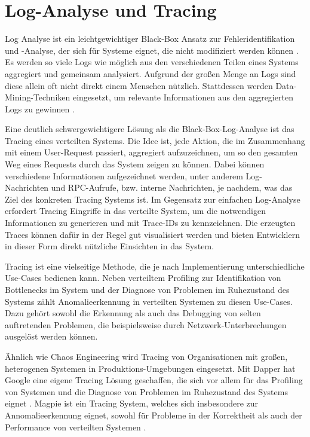 \documentclass[12pt,a4paper]{report}
\begin{document}
\section{Log-Analyse und Tracing}
Log Analyse ist ein leichtgewichtiger Black-Box Ansatz zur Fehleridentifikation und -Analyse, der sich für Systeme eignet, die
nicht modifiziert werden können \cite{challenges_and_options}. Es werden so viele Logs wie möglich aus den
verschiedenen Teilen eines Systems aggregiert und gemeinsam analysiert. Aufgrund der großen Menge an Logs sind diese allein oft
nicht direkt einem Menschen nützlich. Stattdessen werden Data-Mining-Techniken eingesetzt, um relevante Informationen aus den
aggregierten Logs zu gewinnen \cite{log_analysis_at_google}.

Eine deutlich schwergewichtigere Lösung als die Black-Box-Log-Analyse ist das Tracing eines verteilten Systems. Die Idee ist, jede
Aktion, die im Zusammenhang mit einem User-Request passiert, aggregiert aufzuzeichnen, um so den gesamten Weg eines Requests durch
das System zeigen zu können. Dabei können verschiedene Informationen aufgezeichnet werden, unter anderem Log-Nachrichten und
RPC-Aufrufe, bzw. interne Nachrichten, je nachdem, was das Ziel des konkreten Tracing Systems ist. Im Gegensatz zur einfachen
Log-Analyse erfordert Tracing Eingriffe in das verteilte System, um die notwendigen Informationen zu generieren und mit Trace-IDs
zu kennzeichnen. Die erzeugten Traces können dafür in der Regel gut visualisiert werden und bieten Entwicklern in dieser Form
direkt nützliche Einsichten in das System. \cite{dapper_tracing}

Tracing ist eine vielseitige Methode, die je nach Implementierung unterschiedliche Use-Cases bedienen kann. Neben verteiltem
Profiling zur Identifikation von Bottlenecks im System und der Diagnose von Problemen im Ruhezustand des Systems zählt
Anomalieerkennung in verteilten Systemen zu diesen Use-Cases. Dazu gehört sowohl die Erkennung als auch das Debugging von selten
auftretenden Problemen, die beispielsweise durch Netzwerk-Unterbrechungen ausgelöst werden können. \cite{so_you_want_to_trace}

Ähnlich wie Chaos Engineering wird Tracing von Organisationen mit großen, heterogenen Systemen in Produktions-Umgebungen
eingesetzt. Mit Dapper \cite{dapper_tracing} hat Google eine eigene Tracing Lösung geschaffen, die sich vor allem für das
Profiling von Systemen und die Diagnose von Problemen im Ruhezustand des Systems eignet \cite{so_you_want_to_trace}. Magpie
\cite{magpie_tracing} ist ein Tracing System, welches sich insbesondere zur Annomalieerkennung eignet, sowohl für Probleme in der
Korrektheit als auch der Performance von verteilten Systemen \cite{so_you_want_to_trace}.
\end{document}
